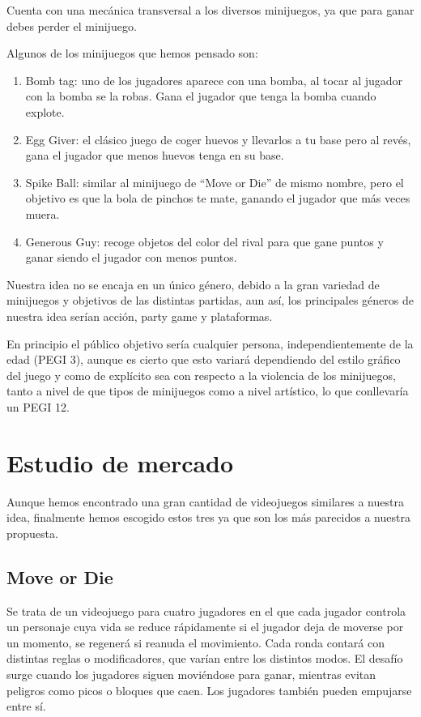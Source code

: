 \documentclass[12pt, spanish]{article}
\begin{document}
Cuenta con una mecánica transversal a los diversos minijuegos, ya que para ganar debes perder el minijuego.

Algunos de los minijuegos que hemos pensado son:

\begin{enumerate}
	\item Bomb tag: uno de los jugadores aparece con una bomba, al tocar al jugador con la bomba se la robas. Gana el jugador que tenga la bomba cuando explote.
	\item Egg Giver: el clásico juego de coger huevos y llevarlos a tu base pero al revés, gana el jugador que menos huevos tenga en su base.
	\item Spike Ball: similar al minijuego de “Move or Die” de mismo nombre, pero el objetivo es que la bola de pinchos te mate, ganando el jugador que más veces muera.
	\item Generous Guy: recoge objetos del color del rival para que gane puntos y ganar siendo el jugador con menos puntos.
\end{enumerate}


Nuestra idea no se encaja en un único género, debido a la gran variedad de minijuegos y objetivos de las distintas partidas, aun así, los principales géneros de nuestra idea serían acción, party game y plataformas.

En principio el público objetivo sería cualquier persona, independientemente de la edad (PEGI 3), aunque es cierto que esto variará dependiendo del estilo gráfico del juego y como de explícito sea con respecto a la violencia de los minijuegos, tanto a nivel de que tipos de minijuegos como a nivel artístico, lo que conllevaría un PEGI 12.

\section{Estudio de mercado}

Aunque hemos encontrado una gran cantidad de videojuegos similares a nuestra idea, finalmente hemos escogido estos tres ya que son los más parecidos a nuestra propuesta.

\subsection{Move or Die}

Se trata de un videojuego para cuatro jugadores en el que cada jugador controla un personaje cuya vida se reduce rápidamente si el jugador deja de moverse por un momento, se regenerá si reanuda el movimiento. Cada ronda contará con distintas reglas o modificadores, que varían entre los distintos modos. El desafío surge cuando los jugadores siguen moviéndose para ganar, mientras evitan peligros como picos o bloques que caen. Los jugadores también pueden empujarse entre sí.
\end{document}

